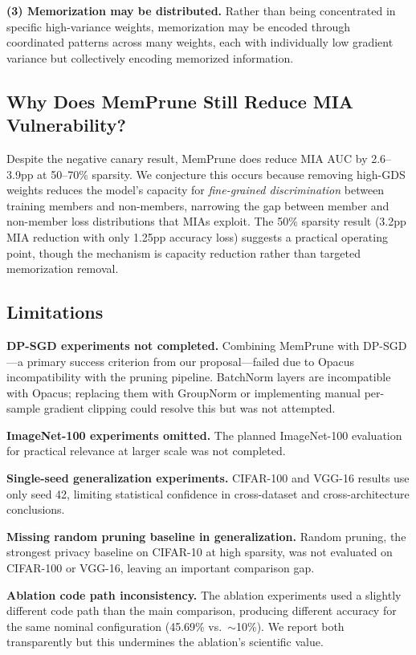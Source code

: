 \documentclass{article}
\begin{document}
\textbf{(3) Memorization may be distributed.} Rather than being concentrated in specific high-variance weights, memorization may be encoded through coordinated patterns across many weights, each with individually low gradient variance but collectively encoding memorized information.

\subsection{Why Does MemPrune Still Reduce MIA Vulnerability?}

Despite the negative canary result, MemPrune does reduce MIA AUC by 2.6--3.9pp at 50--70\% sparsity. We conjecture this occurs because removing high-GDS weights reduces the model's capacity for \emph{fine-grained discrimination} between training members and non-members, narrowing the gap between member and non-member loss distributions that MIAs exploit. The 50\% sparsity result (3.2pp MIA reduction with only 1.25pp accuracy loss) suggests a practical operating point, though the mechanism is capacity reduction rather than targeted memorization removal.

\subsection{Limitations}

\textbf{DP-SGD experiments not completed.} Combining MemPrune with DP-SGD---a primary success criterion from our proposal---failed due to Opacus incompatibility with the pruning pipeline. BatchNorm layers are incompatible with Opacus; replacing them with GroupNorm or implementing manual per-sample gradient clipping could resolve this but was not attempted.

\textbf{ImageNet-100 experiments omitted.} The planned ImageNet-100 evaluation for practical relevance at larger scale was not completed.

\textbf{Single-seed generalization experiments.} CIFAR-100 and VGG-16 results use only seed 42, limiting statistical confidence in cross-dataset and cross-architecture conclusions.

\textbf{Missing random pruning baseline in generalization.} Random pruning, the strongest privacy baseline on CIFAR-10 at high sparsity, was not evaluated on CIFAR-100 or VGG-16, leaving an important comparison gap.

\textbf{Ablation code path inconsistency.} The ablation experiments used a slightly different code path than the main comparison, producing different accuracy for the same nominal configuration (45.69\% vs.\ $\sim$10\%). We report both transparently but this undermines the ablation's scientific value.
\end{document}
